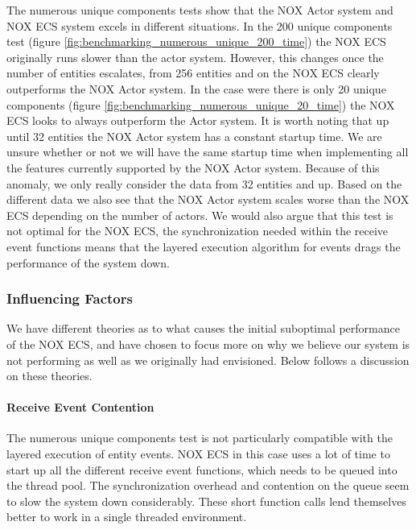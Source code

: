 The numerous unique components tests show that the NOX Actor system and NOX ECS system excels in different situations.
In the 200 unique components test (figure \ref{fig:benchmarking_numerous_unique_200_time}) the NOX ECS originally runs slower than the actor system.
However, this changes once the number of entities escalates, from 256 entities and on the NOX ECS
clearly outperforms the NOX Actor system.
In the case were there is only 20 unique components (figure \ref{fig:benchmarking_numerous_unique_20_time}) the NOX ECS looks to always outperform the Actor system.
It is worth noting that up until 32 entities the NOX Actor system has a constant startup time.
We are unsure whether or not we will have the same startup time when implementing all the features currently
supported by the NOX Actor system.
Because of this anomaly, we only really consider the data from 32 entities and up.
Based on the different data we also see that the NOX Actor system scales worse than the NOX ECS depending on the number of actors.
We would also argue that this test is not optimal for the NOX ECS, the synchronization needed within the receive event functions
means that the layered execution algorithm for events drags the performance of the system down. 

\subsubsection{Influencing Factors}
We have different theories as to what causes the initial suboptimal performance of the NOX ECS,
and have chosen to focus more on why we believe our system is not performing as well as we originally had envisioned.
Below follows a discussion on these theories.

\paragraph{Receive Event Contention}
The numerous unique components test is not particularly compatible with the layered execution of entity events.
NOX ECS in this case uses a lot of time to start up all the different receive event functions, which needs
to be queued into the thread pool.
The synchronization overhead and contention on the queue seem to slow the system down considerably.
These short function calls lend themselves better to work in a single threaded environment.


